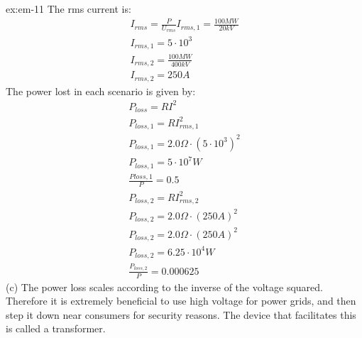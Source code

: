 \begin{solution}{ex:em-11}
  The rms current is:
  \[
    \begin{gathered}
      I_{rms} =  \frac{P}{U_{rms}}
      I_{rms,1} = \frac{100 MW}{20 kV}\\
      I_{rms,1} = 5 \cdot 10^{3}\\
      I_{rms,2} = \frac{100 MW}{400 kV}\\
      I_{rms,2} = 250 A
    \end{gathered}
  \]
  The power lost in each scenario is given by:
  \[
    \begin{gathered}
      P_{loss} = RI^2\\
      P_{loss,1} = RI_{rms,1}^2\\
      P_{loss,1} = 2.0\Omega \cdot (5 \cdot 10^3)^2\\
      P_{loss,1} = 5 \cdot 10^{7} W\\
      \frac{P{loss,1}}{P} = 0.5\\
      P_{loss,2} = RI_{rms,2}^2\\
      P_{loss,2} = 2.0\Omega \cdot (250A)^2\\
      P_{loss,2} = 2.0\Omega \cdot (250A)^2\\
      P_{loss,2} = 6.25 \cdot 10^4 W\\
      \frac{P_{loss,2}}{P} = 0.000625
    \end{gathered}
  \]
  (c) The power loss scales according to the inverse of the voltage squared. Therefore it is extremely beneficial to use high voltage for power grids, and then step it down near consumers for security reasons. The device that facilitates this is called a transformer.
\end{solution}
